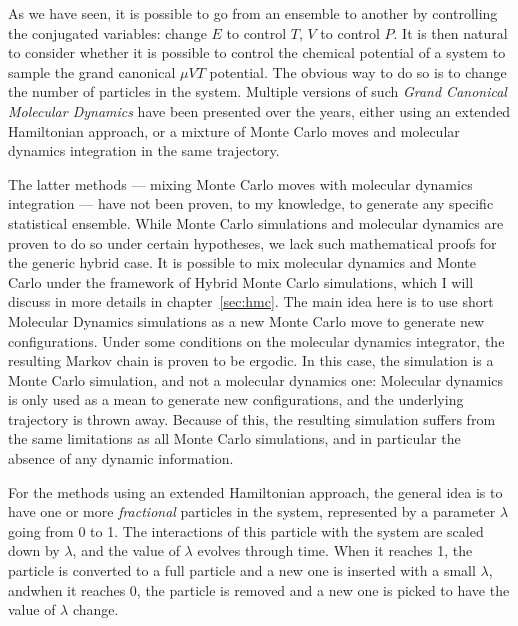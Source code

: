 \documentclass[thesis]{subfiles}
\begin{document}
As we have seen, it is possible to go from an ensemble to another by
controlling the conjugated variables: change $E$ to control $T$, $V$ to control
$P$. It is then natural to consider whether it is possible to control the
chemical potential of a system to sample the grand canonical $\mu V T$
potential. The obvious way to do so is to change the number of particles in the
system. Multiple versions of such \emph{Grand Canonical Molecular Dynamics} have
been presented over the years, either using an extended Hamiltonian
approach\cite{Cagin1991,Lo1995,Eslami2007}, or a mixture of Monte Carlo moves
and molecular dynamics integration in the same
trajectory\cite{Heffelfinger1994,Cracknell1995,Boinepalli2003}.

The latter methods --- mixing Monte Carlo moves with molecular dynamics
integration --- have not been proven, to my knowledge, to generate any specific
statistical ensemble. While Monte Carlo simulations and molecular dynamics are
proven to do so under certain hypotheses, we lack such mathematical proofs for
the generic hybrid case. It is possible to mix molecular dynamics and Monte
Carlo under the framework of Hybrid Monte Carlo simulations, which I will
discuss in more details in chapter~\ref{sec:hmc}. The main idea here is to use
short Molecular Dynamics simulations as a new Monte Carlo move to generate new
configurations. Under some conditions on the molecular dynamics integrator, the
resulting Markov chain is proven to be ergodic. In this case, the simulation is
a Monte Carlo simulation, and not a molecular dynamics one: Molecular dynamics
is only used as a mean to generate new configurations, and the underlying
trajectory is thrown away. Because of this, the resulting simulation suffers
from the same limitations as all Monte Carlo simulations, and in particular the
absence of any dynamic information.

For the methods using an extended Hamiltonian approach, the general idea is to
have one or more \emph{fractional} particles in the system, represented by a
parameter $\lambda$ going from 0 to 1.  The interactions of this particle with
the system are scaled down by $\lambda$, and the value of $\lambda$ evolves
through time. When it reaches 1, the particle is converted to a full particle
and a new one is inserted with a small $\lambda$, andwhen it reaches 0, the
particle is removed and a new one is picked to have the value of $\lambda$
change.
\end{document}
